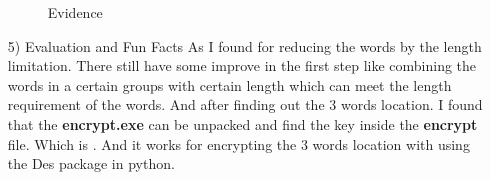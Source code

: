 \documentclass[margin 2cm]{report}
\begin{document}
\begin{enumerate}
\begin{figure}[H]
\centering
{}
\caption{Evidence}
\label{Fig.main}
\end{figure}

\normalsize\item[5)]{Evaluation and Fun Facts}
\newline\normalsize\indent\setlength{\parindent}{2em}As I found for reducing the words by the length limitation. There still have some improve in the first step like combining the words in a certain groups with certain length which can meet the length requirement of the words. And after finding out the 3 words location. I found that the \textbf{encrypt.exe} can be unpacked and find the key inside the \textbf{encrypt} file. Which is . And it works for encrypting the 3 words location with using the Des package in python.
\end{enumerate}
\end{document}
